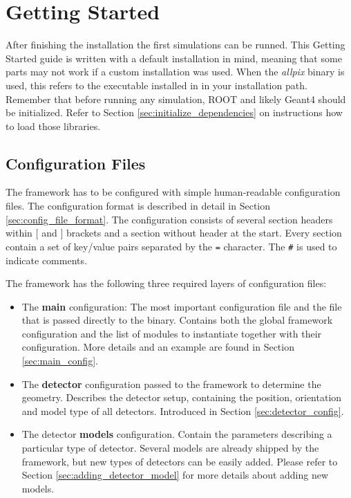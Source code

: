 \section{Getting Started}
After finishing the installation the first simulations can be runned. This Getting Started guide is written with a default installation in mind, meaning that some parts may not work if a custom installation was used. When the \textit{allpix} binary is used, this refers to the executable installed in  in your installation path. Remember that before running any \apsq simulation, ROOT and likely Geant4 should be initialized. Refer to Section \ref{sec:initialize_dependencies} on instructions how to load those libraries.

\subsection{Configuration Files}
\label{sec:configuration_files}
The framework has to be configured with simple human-readable configuration files. The configuration format is described in detail in Section \ref{sec:config_file_format}. The configuration consists of several section headers within $[$ and $]$ brackets and a section without header at the start. Every section contain a set of key/value pairs separated by the \texttt{=} character. The \texttt{\#} is used to indicate comments.

The framework has the following three required layers of configuration files:
\begin{itemize}
\item The \textbf{main} configuration: The most important configuration file and the file that is passed directly to the binary. Contains both the global framework configuration and the list of modules to instantiate together with their configuration. More details and an example are found in Section \ref{sec:main_config}.
\item The \textbf{detector} configuration passed to the framework to determine the geometry. Describes the detector setup, containing the position, orientation and model type of all detectors. Introduced in Section \ref{sec:detector_config}.
\item The detector \textbf{models} configuration. Contain the parameters describing a particular type of detector. Several models are already shipped by the framework, but new types of detectors can be easily added. Please refer to Section \ref{sec:adding_detector_model} for more details about adding new models.
\end{itemize}

